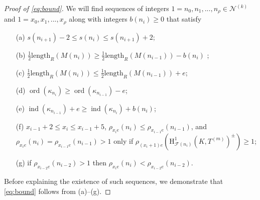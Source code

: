 \documentclass[a4paper,10pt]{amsart}
\numberwithin{equation}{section}
\numberwithin{equation}{section}
\theoremstyle{plain}
\theoremstyle{definition}
\theoremstyle{definition}
\theoremstyle{plain}
\theoremstyle{plain}
\theoremstyle{plain}
\theoremstyle{plain}
\DeclareMathOperator{\ord}{ord}
\newcommand{\ind}{\operatorname{ind}}
\newcommand{\Z}{\mathbb{Z}}
\newcommand{\F}{\mathcal{F}}
\newcommand{\Fcal}{\mathcal{F}}
\newcommand{\cN}{\mathscr{N}}
\newcommand{\fm}{\mathfrak{m}}
\newcommand{\rH}{\mathrm{H}}
\begin{document}
\begin{proof}[Proof of \eqref{eq:bound}]
We will find sequences of integers $1=n_0, n_1,..., n_\rho \in \cN^{(k)}$ and $1=x_0,x_1,...,x_\rho$ along with integers $b(n_i)\geq 0$ that satisfy
\begin{itemize}
\item[(a)] $s(n_{i+1})-2 \leq s(n_{i})\leq s(n_{i+1})+2$;
\item[(b)] $\tfrac{1}{2}\mathrm{length}_{R}(M(n_i))\geq  \tfrac{1}{2}\mathrm{length}_{R}(M(n_{i-1}))- b(n_i)$ ;
\item[(c)] $\tfrac{1}{2}\mathrm{length}_{R}(M(n_i)) \leq \tfrac{1}{2}\mathrm{length}_{R}(M(n_{i-1})) + e$;
\item[(d)] $\ord(\kappa_{n_i})\geq \ord(\kappa_{n_{i-1}})-e$;
\item[(e)] $\ind(\kappa_{n_{i-1}})+e\geq \ind(\kappa_{n_i})+b(n_i)$;
\item[(f)]  $x_{i-1}+2\leq x_i\leq x_{i-1} +5$, $\rho_{x_i e}(n_i) \leq \rho_{x_{i-1}e}(n_{i-1})$, and
$\rho_{x_i e}(n_i) = \rho_{x_{i-1}e}(n_{i-1})>1$ only if $\rho_{(x_i+1)e}(\rH^1_{\F(n_{i})}(K,T^{(m)})^\pm)\geq 1$;
\item[(g)] if $\rho_{x_{i-2}e}(n_{i-2})>1$ then 
$\rho_{x_{i} e}(n_{i}) < \rho_{x_{i-2}e}(n_{i-2})$.
\end{itemize}
Before explaining the existence of such sequences, we demonstrate that \eqref{eq:bound} follows from (a)--(g). 




\end{proof}
\end{document}
